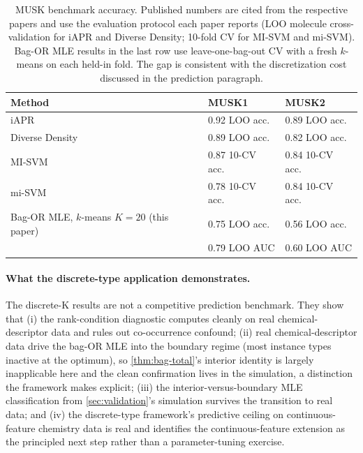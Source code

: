 \begin{table}[t]
\centering
\small
\begin{tabular}{lll}
\toprule
\textbf{Method} & \textbf{MUSK1} & \textbf{MUSK2} \\
\midrule
iAPR \citep{dietterich1997solving}            & 0.92 LOO acc.  & 0.89 LOO acc. \\
Diverse Density \citep{maron1998framework}    & 0.89 LOO acc.  & 0.82 LOO acc. \\
MI-SVM \citep{andrews2003support}             & 0.87 10-CV acc.& 0.84 10-CV acc. \\
mi-SVM \citep{andrews2003support}             & 0.78 10-CV acc.& 0.84 10-CV acc. \\
\midrule
Bag-OR MLE, $k$-means $K = 20$ (this paper)   & 0.75 LOO acc.  & 0.56 LOO acc. \\
                                              & 0.79 LOO AUC   & 0.60 LOO AUC \\
\bottomrule
\end{tabular}
\caption{MUSK benchmark accuracy. Published numbers are cited from
the respective papers and use the evaluation protocol each paper
reports (LOO molecule cross-validation for iAPR and Diverse
Density; 10-fold CV for MI-SVM and mi-SVM). Bag-OR MLE results in
the last row use leave-one-bag-out CV with a fresh $k$-means on
each held-in fold. The gap is consistent with the
discretization cost discussed in the prediction paragraph.}
\label{tab:musk-comparison}
\end{table}

\paragraph{What the discrete-type application demonstrates.} The
discrete-K results are not a competitive prediction benchmark.
They show that (i) the rank-condition diagnostic computes cleanly
on real chemical-descriptor data and rules out co-occurrence
confound; (ii) real chemical-descriptor data drive the bag-OR MLE
into the boundary regime (most instance types inactive at the
optimum), so \cref{thm:bag-total}'s interior identity is largely
inapplicable here and the clean confirmation lives in the
simulation, a distinction the framework makes explicit;
(iii) the interior-versus-boundary MLE
classification from \cref{sec:validation}'s simulation survives the
transition to real data; and (iv) the discrete-type framework's
predictive ceiling on continuous-feature chemistry data is real
and identifies the continuous-feature extension as the principled
next step rather than a parameter-tuning exercise.

